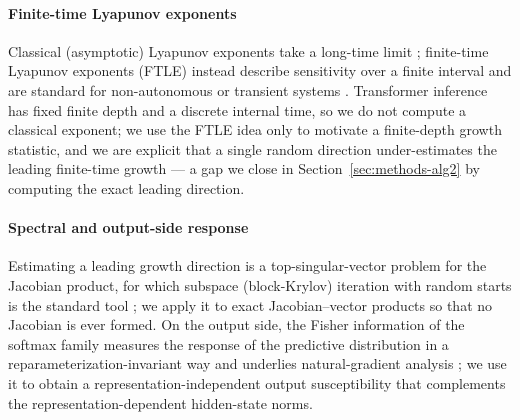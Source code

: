 \documentclass{article}
\begin{document}
\paragraph{Finite-time Lyapunov exponents}
Classical (asymptotic) Lyapunov exponents take a long-time limit
\cite{oseledets1968multiplicative}; finite-time Lyapunov exponents (FTLE) instead describe
sensitivity over a finite interval and are standard for non-autonomous or transient systems
\cite{shadden2005definition,haller2015lagrangian}. Transformer inference has fixed finite depth
and a discrete internal time, so we do not compute a classical exponent; we use the FTLE idea
only to motivate a finite-depth growth statistic, and we are explicit that a single random
direction under-estimates the leading finite-time growth --- a gap we close in
Section~\ref{sec:methods-alg2} by computing the exact leading direction.

\paragraph{Spectral and output-side response}
Estimating a leading growth direction is a top-singular-vector problem for the Jacobian
product, for which subspace (block-Krylov) iteration with random starts is the standard tool
\cite{halko2011finding}; we apply it to exact Jacobian--vector products so that no Jacobian is
ever formed. On the output side, the Fisher information of the softmax family measures the
response of the predictive distribution in a reparameterization-invariant way and underlies natural-gradient
analysis \cite{amari1998natural}; we use it to obtain a representation-independent output
susceptibility that complements the representation-dependent hidden-state norms.
\end{document}
